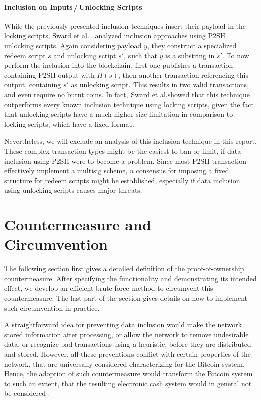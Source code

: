 \documentclass[a4paper,11pt,titlepage]{scrbook}
\begin{document}
\subsubsection*{Inclusion on Inputs\,/\,Unlocking Scripts}
While the previously presented inclusion techniques insert their payload in the locking scripts, Sward et al.~\cite{sward_data_2018} analyzed inclusion approaches using P2SH unlocking scripts.
Again considering payload $y$, they construct a specialized redeem script $s$ and unlocking script $s'$, 
such that $y$ is a substring in $s'$.
To now perform the inclusion into the blockchain, first one publishes a transaction containing P2SH output with $H(s)$, then another transaction referencing this output, containing $s'$ as unlocking script.
This results in two valid transactions, and even require no burnt coins.
In fact, Sward et al.\@ showed that this technique outperforms every known inclusion technique using locking scripts, given the fact that unlocking scripts have a much higher size limitation in comparison to locking scripts, which have a fixed format.

Nevertheless, we will exclude an analysis of this inclusion technique in this report.
These complex transaction types might be the easiest to ban or limit, if data inclusion using P2SH were to become a problem.
Since most P2SH transaction effectively implement a multisig scheme, a consensus for imposing a fixed structure for redeem scripts might be established, especially if data inclusion using unlocking scripts causes major threats.



\chapter{Countermeasure and Circumvention}\label{chap:countermeasure}

The following section first gives a detailed definition of the proof-of-ownership countermeasure. After specifying the functionality and demonstrating its intended effect, we develop an efficient brute-force method to circumvent this countermeasure. The last part of the section gives details on how to implement such circumvention in practice.

A straightforward idea for preventing data inclusion would make the network  stored information after processing, or allow the network to remove undesirable data, or recognize bad transactions using a heuristic, before they are distributed and stored.
However, all these preventions conflict with certain properties of the network, that are universally considered characterizing for the Bitcoin system.
Hence, the adoption of such countermeasure would transform the Bitcoin system to such an extent, that the resulting electronic cash system would in general not be considered .
\end{document}
